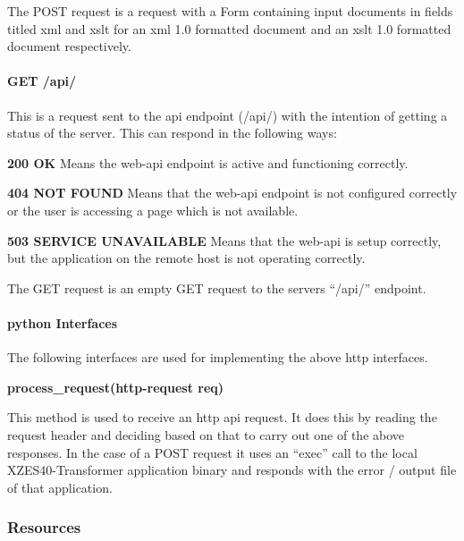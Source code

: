 The POST request is a request with a Form containing input documents in fields titled \gls{xml} and \gls{xslt} for an \gls{xml} 1.0 formatted document and an \gls{xslt} 1.0 formatted document respectively.

\paragraph{GET /api/}

This is a request sent to the \gls{api} endpoint (/api/) with the intention of getting a status of the server. This can respond in the following ways:

\begin{description}
	\item \textbf{200 OK} Means the \gls{web-api} endpoint is active and functioning correctly.
    \item \textbf{404 NOT FOUND} Means that the \gls{web-api} endpoint is not configured correctly or the user is accessing a page which is not available.
    \item \textbf{503 SERVICE UNAVAILABLE} Means that the \gls{web-api} is setup correctly, but the application on the remote host is not operating correctly.
\end{description}

The GET request is an empty GET request to the servers ``/api/'' endpoint.

\paragraph{\gls{python} Interfaces}

The following interfaces are used for implementing the above \gls{http} interfaces.

\textbf{process\_request(http-request req)}

This method is used to receive an \gls{http} \gls{api} request.
It does this by reading the request header and deciding based on that to carry out one of the above responses.
In the case of a POST request it uses an ``exec'' call to the local XZES40-Transformer application binary and responds with the error / output file of that application.

\subsubsection{Resources}

